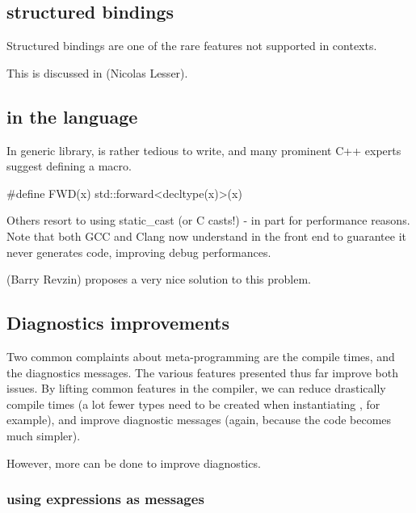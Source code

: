 \documentclass{wg21}
\begin{document}
\subsection{ structured bindings}
\label{sec:constexprstructured}

Structured bindings are one of the rare features not supported in  contexts.

This is discussed in (Nicolas Lesser).

\subsection{ in the language}
\label{sec:forward}


In generic library,  is rather tedious to write, and
many prominent C++ experts suggest defining a macro.

\begin{colorblock}
#define FWD(x) std::forward<decltype(x)>(x)
\end{colorblock}

Others resort to using static_cast (or C casts!) - in part for performance reasons.
Note that both GCC and Clang now understand  in the front end to guarantee it never generates code,
improving debug performances.

 (Barry Revzin) proposes a very nice solution to this problem.

\subsection{Diagnostics improvements}

Two common complaints about meta-programming are the compile times,
and the diagnostics messages.
The various features presented thus far improve both issues. By lifting common features in the compiler,
we can reduce drastically compile times (a lot fewer types need to be created when instantiating , for example), and improve diagnostic messages (again, because the code becomes much simpler).

However, more can be done to improve diagnostics.

\subsubsection{ using expressions as messages}
\label{sec:static_assert_expr}
\end{document}
